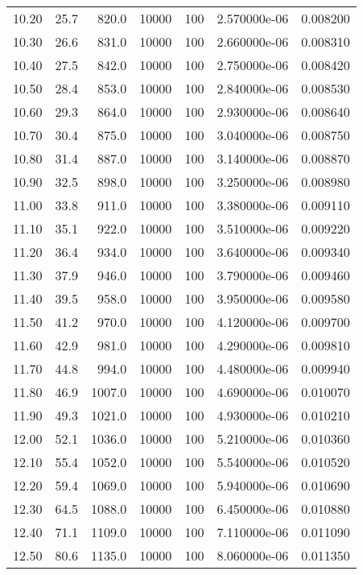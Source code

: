 \begin{tabular}{rrrrrrr}
 10.20 &     25.7 &    820.0 & 10000 & 100 & 2.570000e-06 & 0.008200 \\
 10.30 &     26.6 &    831.0 & 10000 & 100 & 2.660000e-06 & 0.008310 \\
 10.40 &     27.5 &    842.0 & 10000 & 100 & 2.750000e-06 & 0.008420 \\
 10.50 &     28.4 &    853.0 & 10000 & 100 & 2.840000e-06 & 0.008530 \\
 10.60 &     29.3 &    864.0 & 10000 & 100 & 2.930000e-06 & 0.008640 \\
 10.70 &     30.4 &    875.0 & 10000 & 100 & 3.040000e-06 & 0.008750 \\
 10.80 &     31.4 &    887.0 & 10000 & 100 & 3.140000e-06 & 0.008870 \\
 10.90 &     32.5 &    898.0 & 10000 & 100 & 3.250000e-06 & 0.008980 \\
 11.00 &     33.8 &    911.0 & 10000 & 100 & 3.380000e-06 & 0.009110 \\
 11.10 &     35.1 &    922.0 & 10000 & 100 & 3.510000e-06 & 0.009220 \\
 11.20 &     36.4 &    934.0 & 10000 & 100 & 3.640000e-06 & 0.009340 \\
 11.30 &     37.9 &    946.0 & 10000 & 100 & 3.790000e-06 & 0.009460 \\
 11.40 &     39.5 &    958.0 & 10000 & 100 & 3.950000e-06 & 0.009580 \\
 11.50 &     41.2 &    970.0 & 10000 & 100 & 4.120000e-06 & 0.009700 \\
 11.60 &     42.9 &    981.0 & 10000 & 100 & 4.290000e-06 & 0.009810 \\
 11.70 &     44.8 &    994.0 & 10000 & 100 & 4.480000e-06 & 0.009940 \\
 11.80 &     46.9 &   1007.0 & 10000 & 100 & 4.690000e-06 & 0.010070 \\
 11.90 &     49.3 &   1021.0 & 10000 & 100 & 4.930000e-06 & 0.010210 \\
 12.00 &     52.1 &   1036.0 & 10000 & 100 & 5.210000e-06 & 0.010360 \\
 12.10 &     55.4 &   1052.0 & 10000 & 100 & 5.540000e-06 & 0.010520 \\
 12.20 &     59.4 &   1069.0 & 10000 & 100 & 5.940000e-06 & 0.010690 \\
 12.30 &     64.5 &   1088.0 & 10000 & 100 & 6.450000e-06 & 0.010880 \\
 12.40 &     71.1 &   1109.0 & 10000 & 100 & 7.110000e-06 & 0.011090 \\
 12.50 &     80.6 &   1135.0 & 10000 & 100 & 8.060000e-06 & 0.011350 \\

\end{tabular}

